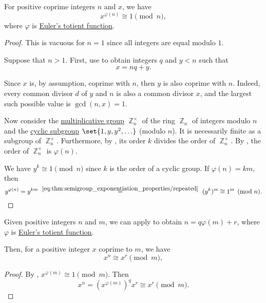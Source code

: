 \begin{theorem}\label{thm:eulers_totient_theorem}
  For positive coprime integers \( n \) and \( x \), we have
  \begin{equation*}
    x^{\varphi(n)} \cong 1 \pmod n,
  \end{equation*}
  where \( \varphi \) is \hyperref[def:eulers_totient_function]{Euler's totient function}.
\end{theorem}
\begin{proof}
  This is vacuous for \( n = 1 \) since all integers are equal modulo \( 1 \).

  Suppose that \( n > 1 \). First, use  to obtain integers \( q \) and \( y < n \) such that
  \begin{equation*}
    x = nq + y.
  \end{equation*}

  Since \( x \) is, by assumption, coprime with \( n \), then \( y \) is also coprime with \( n \). Indeed, every common divisor \( d \) of \( y \) and \( n \) is also a common divisor \( x \), and the largest such possible value is \( \gcd(n, x) = 1 \).

  Now consider the \hyperref[def:semiring]{multiplicative group} \( \BbbZ_n^\times \) of the ring \hyperref[def:ring_of_integers_modulo]{\( \BbbZ_n \)} of integers modulo \( n \) and the \hyperref[def:cyclic_group]{cyclic subgroup} \( \set{ 1, y, y^2, \ldots } \) (modulo \( n \)). It is necessarily finite as a subgroup of \( \BbbZ_n^\times \). Furthermore, by , its order \( k \) divides the order of \( \BbbZ_n^\times \). By , the order of \( \BbbZ_n^\times \) is \( \varphi(n) \).

  We have \( y^k \cong 1 \pmod n \) since \( k \) is the order of a cyclic group. If \( \varphi(n) = km \), then
  \begin{equation*}
    y^{\varphi(n)}
    =
    y^{km}
    \reloset {\eqref{eq:thm:semigroup_exponentiation_properties/repeated}} =
    (y^k)^m
    \cong
    1^m
    \pmod n.
  \end{equation*}
\end{proof}

\begin{corollary}\label{thm:division_modulo}
  Given positive integers \( n \) and \( m \), we can apply  to obtain \( n = q \varphi(m) + r \), where \( \varphi \) is \hyperref[def:eulers_totient_function]{Euler's totient function}.

  Then, for a positive integer \( x \) coprime to \( m \), we have
  \begin{equation*}
    x^n \cong x^r \pmod m,
  \end{equation*}
\end{corollary}
\begin{proof}
  By , \( x^{\varphi(m)} \cong 1 \pmod m \). Then
  \begin{equation*}
    x^n = (x^{\varphi(m)})^q x^r \cong x^r \pmod m.
  \end{equation*}
\end{proof}


